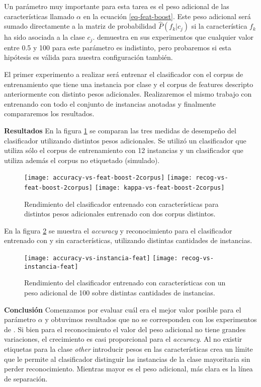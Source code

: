 Un parámetro muy importante para esta tarea es el peso adicional de las características llamado $\alpha$ en la ecuación \ref{eq-feat-boost}. Este peso adicional será sumado directamente a la matriz de probabilidad $\hat{P}(f_k|c_j)$ si la característica $f_k$ ha sido asociada a la clase $c_j$. \citet{dualist} demuestra en sus experimentos que cualquier valor entre 0.5 y 100 para este parámetro es indistinto, pero probaremos si esta hipótesis es válida para nuestra configuración también.

El primer experimento a realizar será entrenar el clasificador con el corpus de entrenamiento que tiene una instancia por clase y el corpus de features descripto anteriormente con distinto pesos adicionales. Realizaremos el mismo trabajo con entrenando con todo el conjunto de instancias anotadas y finalmente compararemos los resultados.

\vspace{3 mm}

\textbf{Resultados}
En la figura \ref{comp-feature-boost} se comparan las tres medidas de desempeño del clasificador utilizando distintos pesos adicionales. Se utilizó un clasificador que utiliza sólo el corpus de entrenamiento con 12 instancias y un clasificador que utiliza además el corpus no etiquetado (simulado).

\begin{figure}[h!]\label{comp-feature-boost}
\centering
\texttt{[image: accuracy-vs-feat-boost-2corpus]}
\texttt{[image: recog-vs-feat-boost-2corpus]}
\texttt{[image: kappa-vs-feat-boost-2corpus]}
\caption{Rendimiento del clasificador entrenado con características para distintos pesos adicionales entrenado con dos corpus distintos.}
\end{figure}

En la figura \ref{comp-feat-tr-inst} se muestra el \textit{accuracy} y reconocimiento para el clasificador entrenado con y sin características, utilizando distintas cantidades de instancias.

\begin{figure}[h!]\label{comp-feat-tr-inst}
\centering
\texttt{[image: accuracy-vs-instancia-feat]}
\texttt{[image: recog-vs-instancia-feat]}
\caption{Rendimiento del clasificador entrenado con características con un peso adicional de 100 sobre distintas cantidades de instancias.}
\end{figure}
\vspace{3 mm}

\textbf{Conclusión}
Comenzamos por evaluar cuál era el mejor valor posible para el parámetro $\alpha$ y obtuvimos resultados que no se corresponden con los experimentos de \citet{dualist}. Si bien para el reconocimiento el valor del peso adicional no tiene grandes variaciones, el crecimiento es casi proporcional para el \textit{accuracy}. Al no existir etiquetas para la clase \textit{other} introducir pesos en las características crea un límite que le permite al clasificador distinguir las instancias de la clase mayoritaria sin perder reconocimiento. Mientras mayor es el peso adicional, más clara es la línea de separación.

